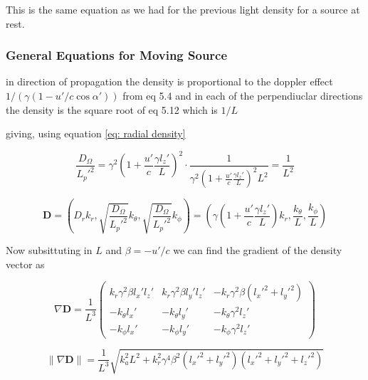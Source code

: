 This is the same equation as we had for the previous light density for a source at rest.

\subsubsection{General Equations for Moving Source}\label{subsubsect: General Equations for Moving Source 1}

in direction of propagation the density is proportional to the doppler effect $ 1/ ( \gamma( 1 - u'/c \cos{\alpha'}) )$ from eq 5.4 and in each of the perpendiuclar directions the density is the square root of eq 5.12 which is  $ 1/ L$

giving, using equation \eqref{eq: radial density}

\begin{equation}
	\frac{D_\Omega}{L_p'^2} =  {\gamma}^2\left(1 + \dfrac{u'}{c}\frac{\gamma l_z'}{L}\right)^2 \cdot \frac{1}{\gamma^2 \left( 1 + \frac{u'}{c} \frac{\gamma l_z'}{L} \right)^2 L^2} = \frac{1}{L^2}
\end{equation}

\begin{equation}
	\mathbf{D} = \left( D_r k_r , \sqrt{\frac{D_\Omega}{L_p'^2}} k_\theta, \sqrt{\frac{D_\Omega}{L_p'^2}}k_\phi \right) = \left({\gamma}\left(1 + \dfrac{u'}{c}\frac{\gamma l_z'}{L}\right) k_r , \frac{k_\theta}{L}, \frac{k_\phi}{L} \right)
\end{equation}

Now subsittuting in $L$ and $\beta = - u'/c$ we can find the gradient of the density vector as

\begin{derivation}


\begin{equation}
	\nabla \mathbf{D} = \frac{1}{L^3}
	\begin{pmatrix}
		k_r \gamma^2 \beta l_x'l_z' & k_r \gamma^2 \beta l_y'l_z' & - k_r \gamma^2 \beta (l_x'^2 +l_y'^2)  \\
		-k_\theta l_x' & -k_\theta l_y' & -k_\theta\gamma^2 l_z' \\
		-k_\phi l_x' & -k_\phi l_y' & -k_\phi\gamma^2 l_z'
	\end{pmatrix}
\end{equation}

\begin{equation}
	\| \nabla \mathbf{D} \| = \frac{1}{L^3} \sqrt{ k_{a}^2 L^2 + k_r^2 \gamma^4 \beta^2  (l_x'^2+l_y'^2)( l_x'^2 + l_y'^2 + l_z'^2 )}
\end{equation}

\end{derivation}

